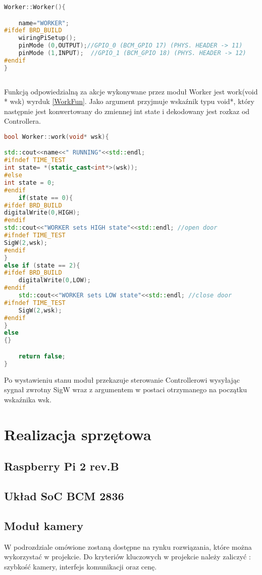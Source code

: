 \begin{lstlisting}[caption = {Konstruktor klasy Worker.}, label=Worker, language=C++]
Worker::Worker(){

	name="WORKER";
#ifdef BRD_BUILD
	wiringPiSetup();
	pinMode (0,OUTPUT);//GPIO_0 (BCM_GPIO 17) (PHYS. HEADER -> 11)
	pinMode (1,INPUT);	//GPIO_1 (BCM_GPIO 18) (PHYS. HEADER -> 12)
#endif
}
     
\end{lstlisting}

Funkcją odpowiedzialną za akcje wykonywane przez moduł Worker jest work(void * wsk) wyrduk \ref{WorkFun}. Jako argument przyjmuje wskaźnik typu void*, który następnie jest konwertowany do zmiennej int state i dekodowany jest rozkaz od Controllera.

\begin{lstlisting}[caption = {Funkcja work klasy Worker}, label=WorkFun, language=C++]
bool Worker::work(void* wsk){

std::cout<<name<<" RUNNING"<<std::endl;
#ifndef TIME_TEST
int state= *(static_cast<int*>(wsk));
#else
int state = 0;
#endif
	if(state == 0){
#ifdef BRD_BUILD
digitalWrite(0,HIGH);
#endif
std::cout<<"WORKER sets HIGH state"<<std::endl; //open door
#ifndef TIME_TEST
SigW(2,wsk);
#endif
}
else if (state == 2){
#ifdef BRD_BUILD
	digitalWrite(0,LOW);
#endif
	std::cout<<"WORKER sets LOW state"<<std::endl; //close door
#ifndef TIME_TEST
	SigW(2,wsk);
#endif
}
else
{}

	return false;
}

\end{lstlisting}

Po wystawieniu stanu moduł przekazuje sterowanie Controllerowi wysyłając sygnał zwrotny SigW wraz z argumentem w postaci otrzymanego na początku wskaźnika wsk.

\section{ Realizacja sprzętowa }
\subsection{Raspberry Pi 2 rev.B}
\subsection{Układ SoC BCM 2836}
\subsection{Moduł kamery}
W podrozdziale omówione zostaną dostępne na rynku rozwiązania, które można wykorzystać w projekcie.  Do kryteriów kluczowych w projekcie należy zaliczyć : szybkość kamery, interfejs komunikacji oraz cenę. 

